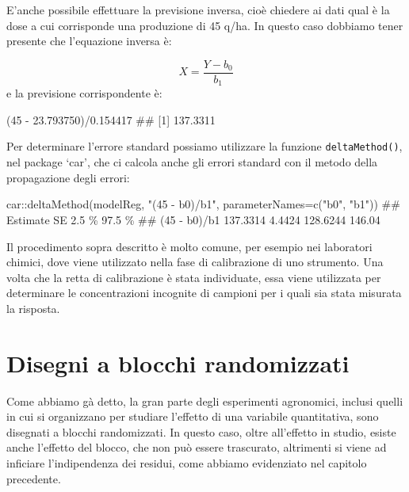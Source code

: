 \documentclass[a4paper,12pt,oneside]{book}
\newenvironment{Shaded}{\begin{snugshade}}{\end{snugshade}}
\newcommand{\DecValTok}[1]{#1}
\newcommand{\FloatTok}[1]{#1}
\newcommand{\SpecialCharTok}[1]{#1}
\newcommand{\StringTok}[1]{#1}
\newcommand{\DocumentationTok}[1]{#1}
\newcommand{\FunctionTok}[1]{#1}
\newcommand{\AttributeTok}[1]{#1}
\newcommand{\NormalTok}[1]{#1}
\begin{document}
E'anche possibile effettuare la previsione inversa, cioè chiedere ai dati qual è la dose a cui corrisponde una produzione di 45 q/ha. In questo caso dobbiamo tener presente che l'equazione inversa è:

\[X = \frac{Y - b_0}{b_1}\]
e la previsione corrispondente è:

\begin{Shaded}
\begin{Highlighting}[]
\NormalTok{(}\DecValTok{45} \SpecialCharTok{{-}} \FloatTok{23.793750}\NormalTok{)}\SpecialCharTok{/}\FloatTok{0.154417}
\DocumentationTok{\#\# [1] 137.3311}
\end{Highlighting}
\end{Shaded}

Per determinare l'errore standard possiamo utilizzare la funzione \texttt{deltaMethod()}, nel package `car', che ci calcola anche gli errori standard con il metodo della propagazione degli errori:

\begin{Shaded}
\begin{Highlighting}[]
\NormalTok{car}\SpecialCharTok{::}\FunctionTok{deltaMethod}\NormalTok{(modelReg, }\StringTok{"(45 {-} b0)/b1"}\NormalTok{, }
                 \AttributeTok{parameterNames=}\FunctionTok{c}\NormalTok{(}\StringTok{"b0"}\NormalTok{, }\StringTok{"b1"}\NormalTok{))}
\DocumentationTok{\#\#              Estimate       SE    2.5 \% 97.5 \%}
\DocumentationTok{\#\# (45 {-} b0)/b1 137.3314   4.4424 128.6244 146.04}
\end{Highlighting}
\end{Shaded}

Il procedimento sopra descritto è molto comune, per esempio nei laboratori chimici, dove viene utilizzato nella fase di calibrazione di uno strumento. Una volta che la retta di calibrazione è stata individuate, essa viene utilizzata per determinare le concentrazioni incognite di campioni per i quali sia stata misurata la risposta.

\hypertarget{disegni-a-blocchi-randomizzati-1}{%
\section{Disegni a blocchi randomizzati}\label{disegni-a-blocchi-randomizzati-1}}

Come abbiamo gà detto, la gran parte degli esperimenti agronomici, inclusi quelli in cui si organizzano per studiare l'effetto di una variabile quantitativa, sono disegnati a blocchi randomizzati. In questo caso, oltre all'effetto in studio, esiste anche l'effetto del blocco, che non può essere trascurato, altrimenti si viene ad inficiare l'indipendenza dei residui, come abbiamo evidenziato nel capitolo precedente.
\end{document}
